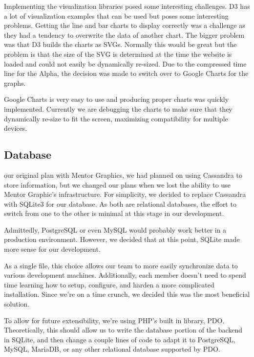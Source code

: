 \documentclass[journal]{IEEEtran}
\begin{document}
Implementing the visualization libraries posed some interesting challenges. D3 has a lot of visualization examples that can be used but poses some interesting problems. Getting the line and bar charts to display correctly was a challenge as they had a tendency to overwrite the data of another chart. The bigger problem was that D3 builds the charts as SVGs. Normally this would be great but the problem is that the size of the SVG is determined at the time the website is loaded and could not easily be dynamically re-sized. Due to the compressed time line for the Alpha, the decision was made to switch over to Google Charts for the graphs.

Google Charts is very easy to use and producing proper charts was quickly implemented. Currently we are debugging the charts to make sure that they dynamically re-size to fit the screen, maximizing compatibility for multiple devices.


\subsection{Database}
 our original plan with Mentor Graphics, we had planned on using Cassandra to store information, but we changed our plans when we lost the ability to use Mentor Graphic's infrastructure. For simplicity, we decided to replace Cassandra with SQLite3 for our database. As both are relational databases, the effort to switch from one to the other is minimal at this stage in our development. 

Admittedly, PostgreSQL or even MySQL would probably work better in a production environment. However, we decided that at this point, SQLite made more sense for our development.  

As a single file, this choice allows our team to more easily synchronize data to various development machines. Additionally, each member doesn't need to spend time learning how to setup, configure, and harden a more complicated installation. Since we're on a time crunch, we decided this was the most beneficial solution. 

To allow for future extensibility, we're using PHP's built in library, PDO. Theoretically, this should allow us to write the database portion of the backend in SQLite, and then change a couple lines of code to adapt it to PostgreSQL, MySQL, MariaDB, or any other relational database supported by PDO. 

\end{document}
